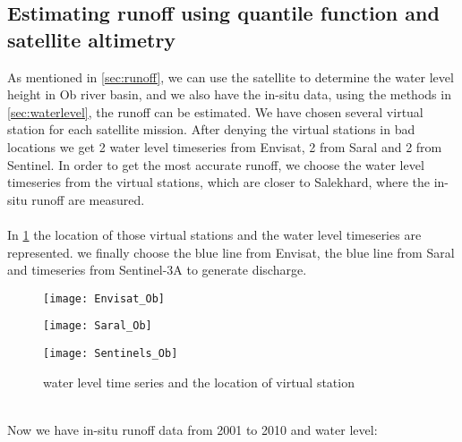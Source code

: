 \subsection{Estimating runoff using quantile function and satellite altimetry}
 As mentioned in \ref{sec:runoff}, we can use the satellite to determine the water level height in Ob river basin, and we also have the in-situ data, using the methods in \ref{sec:waterlevel}, the runoff can be estimated. We have chosen several virtual station for each satellite mission. After denying the virtual stations in bad locations we get 2 water level timeseries from Envisat, 2 from Saral and 2 from Sentinel. In order to get the most accurate runoff, we choose the water level timeseries from the virtual stations, which are closer to Salekhard, where the in-situ runoff are measured. \\\\
 In \ref{fig:waterlevel} the location of those virtual stations and the water level timeseries are represented. we finally choose the blue line from Envisat, the blue line from Saral and timeseries from Sentinel-3A to generate discharge.
 \begin{figure}[htbp]
 	\centering
 	\begin{minipage}[t]{0.7\textwidth}
 		\centering
 		\texttt{[image: Envisat\_Ob]} %
 	\end{minipage}
 	\begin{minipage}[t]{0.7\textwidth}
 		\centering
 		\texttt{[image: Saral\_Ob]} %
 	\end{minipage}
 \begin{minipage}[t]{0.7\textwidth}
 	\centering
 	\texttt{[image: Sentinels\_Ob]} %
 \end{minipage}
 \caption{water level time series and the location of virtual station}
 \label{fig:waterlevel}
 \end{figure}
\\
Now we have in-situ runoff data from 2001 to 2010 and water level: